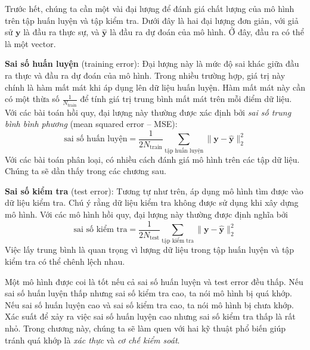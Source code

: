 Trước hết, chúng ta cần một vài đại lượng để đánh giá chất lượng của mô hình
trên tập huấn luyện và tập kiểm tra. Dưới đây là hai đại lượng đơn giản, với
giả sử $\mathbf{y}$ là đầu ra thực sự, và $\mathbf{\hat{y}}$ là đầu ra dự đoán
của mô hình. Ở đây, đầu ra có thể là một vector.

\textbf{Sai số huấn luyện} (training error): Đại lượng này là mức độ sai khác giữa đầu ra thực và đầu
ra dự đoán của mô hình. Trong nhiều trường hợp, giá trị này chính là hàm mất mát khi áp dụng lên dữ liệu huấn luyện. Hàm mất mát này cần có một thừa số $\displaystyle
\frac{1}{N_{\text{train}}}$ để tính giá trị trung bình mất mát
trên mỗi điểm dữ liệu. Với các bài toán hồi quy, đại lượng này thường được xác định bởi \textit{sai số trung bình bình phương} ({mean squared error -- MSE}):
\begin{equation*}
\text{sai số huấn luyện}= \frac{1}{2N_{\text{train}}} \sum_{\text{tập huấn luyện}}
\|\mathbf{y} - \mathbf{\hat{y}}\|_2^2
\end{equation*}
Với các bài toán phân loại, có nhiều cách đánh giá mô hình trên các tập dữ liệu. Chúng ta sẽ dần thấy trong các chương sau.

\textbf{Sai số kiểm tra} (test error): Tương tự như trên, áp dụng mô hình tìm được vào dữ liệu kiểm tra. Chú ý rằng dữ liệu kiểm tra không được sử dụng khi xây dựng mô hình. Với các mô hình hồi quy, đại lượng này thường được định nghĩa bởi
\begin{equation*}
\text{sai số kiểm tra}= \frac{1}{2N_{\text{test}}} \sum_{\text{tập kiểm tra}} \|\mathbf{y} - \mathbf{\hat{y}}\|_2^2
\end{equation*}
{Việc lấy trung bình là quan trọng vì lượng dữ liệu trong tập huấn
luyện và tập kiểm tra có thể chênh lệch nhau.}

Một mô hình được coi là tốt nếu cả {sai số huấn luyện} và {test
error} đều thấp. Nếu {sai số huấn luyện} thấp nhưng {sai số kiểm tra} cao,
ta nói mô hình bị quá khớp. Nếu {sai số huấn luyện} cao và {sai số kiểm tra} cao, ta nói mô hình bị chưa khớp. Xác suất để xảy ra việc
{sai số huấn luyện} cao nhưng {sai số kiểm tra} thấp là rất nhỏ.
Trong chương này, chúng ta sẽ làm quen với hai kỹ thuật phổ biến giúp tránh
quá khớp là \textit{xác thực} và \textit{cơ chế kiểm soát}.

